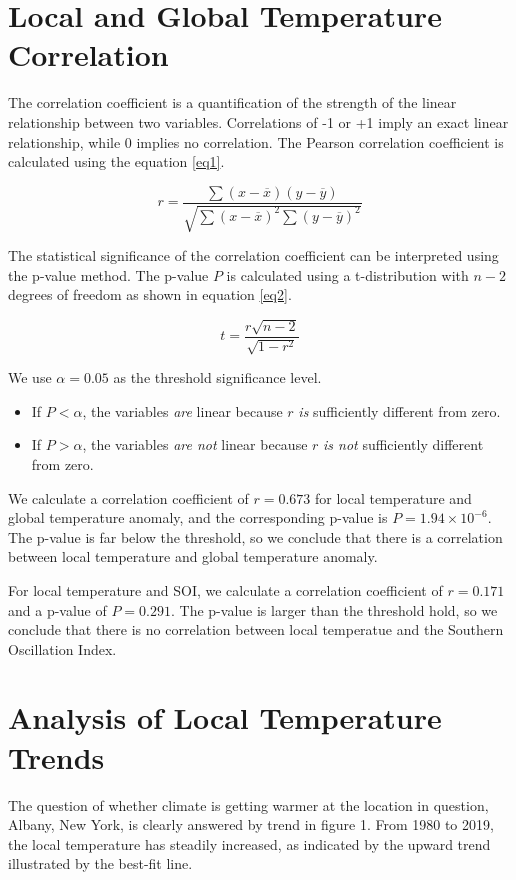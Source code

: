 \documentclass[12pt]{article}
\begin{document}
\section*{Local and Global Temperature Correlation}
The correlation coefficient is a quantification of the
strength of the linear relationship between two variables.
Correlations of -1 or +1 imply an exact linear relationship,
while 0 implies no correlation.
The Pearson correlation coefficient is calculated using
the equation \ref{eq1}.

\begin{equation}\label{eq1}
	r = \frac{\sum (x - \overline{x}) (y - \overline{y})}
        {\sqrt{\sum (x - \overline{x})^2 \sum (y - \overline{y})^2}}
\end{equation}

The statistical significance of the correlation coefficient can be
interpreted using the p-value method.
The p-value $P$ is calculated using a t-distribution with
$n - 2$ degrees of freedom as shown in equation \ref{eq2}.

\begin{equation}\label{eq2}
	t = \frac{r \sqrt{n-2}}{\sqrt{1 - r^2}}
\end{equation}

We use $\alpha = 0.05$ as the threshold significance level.
\begin{itemize}
	\item If $P < \alpha$, the variables \textit{are}
	linear because $r$ \textit{is} sufficiently different from zero.
	\item If $P > \alpha$, the variables \textit{are not}
	linear because $r$ \textit{is not} sufficiently different from zero.
\end{itemize}

We calculate a correlation coefficient of $r = 0.673$ for
local temperature and global temperature anomaly,
and the corresponding p-value is $P = 1.94 \times 10^{-6}$.
The p-value is far below the threshold, so we conclude that
there is a correlation between local temperature and
global temperature anomaly.

For local temperature and SOI, we calculate a correlation
coefficient of $r = 0.171$ and a p-value of $P = 0.291$.
The p-value is larger than the threshold hold, so we
conclude that there is no correlation between local temperatue
and the Southern Oscillation Index.

\section*{Analysis of Local Temperature Trends}
The question of whether climate is getting warmer at the
location in question, Albany, New York, is clearly answered by
trend in figure 1.
From 1980 to 2019, the local temperature has steadily increased,
as indicated by the upward trend illustrated by the best-fit line.
\end{document}
